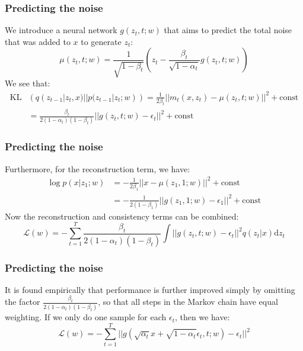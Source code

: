 \documentclass{beamer}
\begin{document}
\begin{frame}
    \frametitle{Predicting the noise}
    We introduce a neural network $g(z_{t},t;w)$ that aims to predict the total noise that was added to $x$ to generate $z_{t}$:
    \begin{equation*}
        \mu(z_{t},t;w)=\frac{1}{\sqrt{1-\beta_{t}}}(z_{t}-\frac{\beta_{t}}{\sqrt{1-\alpha_{t}}}g(z_{t},t;w))
    \end{equation*}
    We see that:
    \begin{align*}
        \mathrm{KL}&(q(z_{t-1}|z_{t},x)||p(z_{t-1}|z_{t};w))=\frac{1}{2\beta_{t}}||m_{t}(x,z_{t})-\mu(z_{t},t;w)||^{2}+\textrm{const} \\
        &=\frac{\beta_{t}}{2(1-\alpha_{t})(1-\beta_{t})}||g(z_{t},t;w)-\epsilon_{t}||^{2}+\textrm{const}
    \end{align*}
\end{frame}

\begin{frame}
    \frametitle{Predicting the noise}
    Furthermore, for the reconstruction term, we have:
    \begin{align*}
        \log{}p(x|z_{1};w)&=-\frac{1}{2\beta_{1}}||x-\mu(z_{1},1;w)||^{2}+\textrm{const} \\
        &=-\frac{1}{2(1-\beta_{1})}||g(z_{1},1;w)-\epsilon_{1}||^{2}+\textrm{const}
    \end{align*}
    Now the reconstruction and consistency terms can be combined:
    \begin{equation*}
        \mathcal{L}(w)=-\sum_{t=1}^{T}\frac{\beta_{t}}{2(1-\alpha_{t})(1-\beta_{t})}\int||g(z_{t},t;w)-\epsilon_{t}||^{2}q(z_{t}|x)\mathrm{d}z_{t}
    \end{equation*}
\end{frame}

\begin{frame}
    \frametitle{Predicting the noise}
    It is found empirically that performance is further improved simply by omitting the factor $\frac{\beta_{t}}{2(1-\alpha_{t})(1-\beta_{t})}$, so that all steps in the Markov chain have equal weighting. If we only do one sample for each $\epsilon_{t}$, then we have:
    \begin{equation*}
        \mathcal{L}(w)=-\sum_{t=1}^{T}||g(\sqrt{\alpha_{t}}x+\sqrt{1-\alpha_{t}}\epsilon_{t},t;w)-\epsilon_{t}||^{2}
    \end{equation*}
\end{frame}
\end{document}
